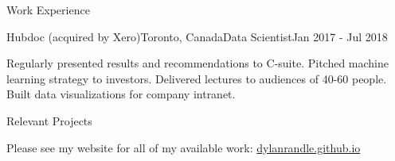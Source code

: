 \documentclass{resume} %
\begin{document}
\begin{rSection}{Work Experience}
\begin{rSubsection}{Hubdoc (acquired by Xero)}{Toronto, Canada}{Data Scientist}{Jan 2017 - Jul 2018}
\item 
    Regularly presented results and recommendations to C-suite.
    Pitched machine learning strategy to investors.
    Delivered lectures to audiences of 40-60 people.
    Built data visualizations for company intranet. 
\end{rSubsection}


\end{rSection}


\begin{rSection}{Relevant Projects}

Please see my website for all of my available work: \url{dylanrandle.github.io}




\end{rSection}




\end{document}
